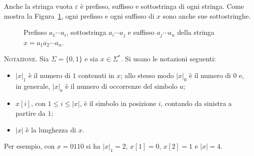 \documentclass[a4paper, 11pt, oneside]{book}
\theoremstyle{formale}
\begin{document}
    Anche la stringa vuota $\varepsilon$ \`e prefisso, suffisso e sottostringa di ogni
    stringa. Come mostra la Figura~\ref{fig:sottostringhe}, ogni prefisso e ogni suffisso
    di $x$ sono anche sue sottostringhe.

    \begin{figure}[H]
        \centering
        \caption{Prefisso $a_1 \cdots a_i$, sottostringa $a_i \cdots a_j$ e suffisso
            $a_j \cdots a_n$ della stringa $x = a_1 a_2 \cdots a_n$.}
        \label{fig:sottostringhe}
    \end{figure}

    \textsc{Notazione}. Sia $\Sigma = \{0, 1\}$ e sia $x \in \Sigma^*$. Si usano le
    notazioni seguenti:
    \begin{itemize}
        \item $|x|_1$ \`e il numero di $1$ contenuti in $x$; allo stesso modo $|x|_0$ \`e
            il numero di $0$ e, in generale, $|x|_a$ \`e il numero di occorrenze del
            simbolo $a$;
        \item $x[i]$, con $1 \leq i \leq |x|$, \`e il simbolo in posizione $i$, contando
            da sinistra a partire da $1$;
        \item $|x|$ \`e la lunghezza di $x$.
    \end{itemize}
    Per esempio, con $x = 0110$ si ha $|x|_1 = 2$, $x[1] = 0$, $x[2] = 1$ e $|x| = 4$.
\end{document}
